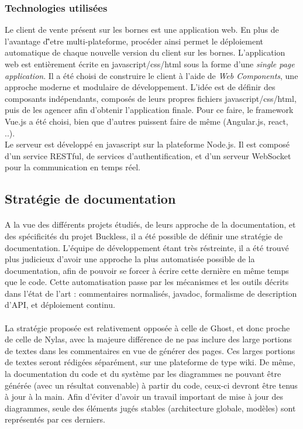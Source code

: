     \subsubsection{Technologies utilisées}
        Le client de vente présent sur les bornes est une application web. En plus de l'avantage d'̂etre
        multi-plateforme, procéder ainsi permet le déploiement automatique de chaque nouvelle version
        du client sur les bornes. L'application web est entièrement écrite en javascript/css/html
        sous la forme d'une \textit{single page application}. Il a été choisi de construire le
        client à l'aide de \textit{Web Components}, une approche moderne et modulaire de développement.
        L'idée est de définir des composants indépendants, composés de leurs propres fichiers javascript/css/html,
        puis de les agencer afin d'obtenir l'application finale. Pour ce faire, le framework Vue.js
        a été choisi, bien que d'autres puissent faire de même (Angular.js, react, ..).\\
        Le serveur est développé en javascript sur la plateforme Node.js. Il est composé d'un service
        RESTful, de services d'authentification, et d'un serveur WebSocket pour la communication en
        temps réel.


\subsection{Stratégie de documentation}
    \paragraph{}
        A la vue des différents projets étudiés, de leurs approche de la documentation, et des
        spécificités du projet Buckless, il a été possible de définir une stratégie de documentation.
        L'équipe de développement étant très réstreinte, il a été trouvé plus judicieux d'avoir une approche
        la plus automatisée possible de la documentation, afin de pouvoir se forcer à écrire cette dernière
        en même temps que le code. Cette automatisation passe par les mécanismes et les outils décrits
        dans l'état de l'art : commentaires normalisés, javadoc, formalisme de description d'API, et
        déploiement continu.

    \paragraph{}
        La stratégie proposée est relativement opposée à celle de Ghost, et donc proche de celle
        de Nylas, avec la majeure différence de ne pas inclure des large portions de textes dans les commentaires
        en vue de générer des pages. Ces larges portions de textes seront rédigées séparément, sur une plateforme
        de type wiki. De même, la documentation du code et du système par les diagrammes ne pouvant être
        générée (avec un résultat convenable) à partir du code, ceux-ci devront être tenus à jour à la main.
        Afin d'éviter d'avoir un travail important de mise à jour des diagrammes, seule des éléments
        jugés stables (architecture globale, modèles) sont représentés par ces derniers.


